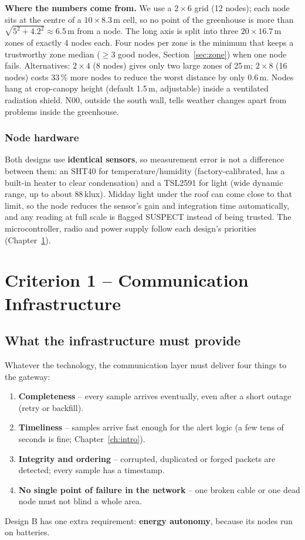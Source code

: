 \documentclass[11pt,a4paper]{report}
\newcommand{\why}[1]{\par\noindent\colorbox{gray!10}{\parbox{\dimexpr\linewidth-2\fboxsep}{\small\textbf{Where the numbers come from.} #1}}\par}
\begin{document}
\why{We use a $2\times6$ grid (12 nodes); each node sits at the centre of a $10\times8.3$\,m cell, so no point of the greenhouse is more than $\sqrt{5^2+4.2^2}\approx 6.5$\,m from a node. The long axis is split into three $20\times16.7$\,m zones of exactly 4 nodes each. Four nodes per zone is the minimum that keeps a trustworthy zone median ($\geq 3$ good nodes, Section~\ref{sec:zone}) when one node fails. Alternatives: $2\times4$ (8 nodes) gives only two large zones of 25\,m; $2\times8$ (16 nodes) costs 33\,\% more nodes to reduce the worst distance by only 0.6\,m. Nodes hang at crop-canopy height (default 1.5\,m, adjustable) inside a ventilated radiation shield. N00, outside the south wall, tells weather changes apart from problems inside the greenhouse.}

\subsection{Node hardware}
Both designs use \textbf{identical sensors}, so measurement error is not a difference between them: an SHT40 for temperature/humidity (factory-calibrated, has a built-in heater to clear condensation) and a TSL2591 for light (wide dynamic range, up to about 88\,klux). Midday light under the roof can come close to that limit, so the node reduces the sensor's gain and integration time automatically, and any reading at full scale is flagged SUSPECT instead of being trusted. The microcontroller, radio and power supply follow each design's priorities (Chapter~\ref{ch:comm}).

\chapter{Criterion 1 -- Communication Infrastructure}\label{ch:comm}

\section{What the infrastructure must provide}
Whatever the technology, the communication layer must deliver four things to the gateway:
\begin{enumerate}[noitemsep]
  \item \textbf{Completeness} -- every sample arrives eventually, even after a short outage (retry or backfill).
  \item \textbf{Timeliness} -- samples arrive fast enough for the alert logic (a few tens of seconds is fine; Chapter~\ref{ch:intro}).
  \item \textbf{Integrity and ordering} -- corrupted, duplicated or forged packets are detected; every sample has a timestamp.
  \item \textbf{No single point of failure in the network} -- one broken cable or one dead node must not blind a whole area.
\end{enumerate}
Design B has one extra requirement: \textbf{energy autonomy}, because its nodes run on batteries.
\end{document}
